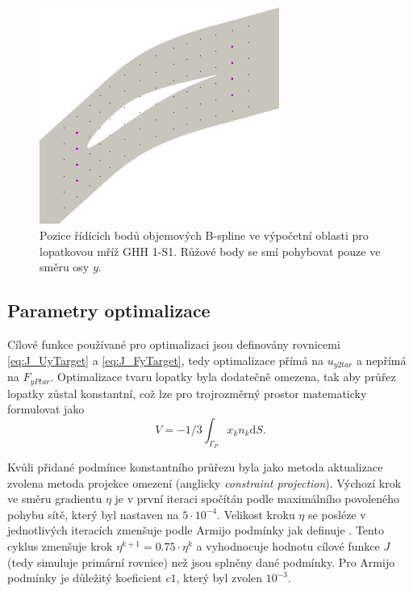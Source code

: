 \begin{figure}
	\includegraphics[width=0.7\textwidth]{img/cps.png}
	\caption{Pozice řídících bodů objemových B-spline ve výpočetní oblasti pro lopatkovou mříž GHH 1-S1. Růžové body se smí pohybovat pouze ve směru osy $ y $.}
	\label{fig:ghs1_cps}
\end{figure}


\subsection{Parametry optimalizace}
Cílové funkce používané pro optimalizaci jsou definovány rovnicemi \ref{eq:J_UyTarget} a \ref{eq:J_FyTarget}, tedy optimalizace přímá na $ u_{y2tar} $ a nepřímá na $ F_{yPtar} $. Optimalizace tvaru lopatky byla dodatečně omezena, tak aby průřez lopatky zůstal konstantní, což lze pro trojrozměrný prostor matematicky formulovat jako
\begin{equation} 
V=-1/3\int_{\Gamma_P}x_kn_k\mathrm{d}S.
\end{equation}

Kvůli přidané podmínce konstantního průřezu byla jako metoda aktualizace zvolena metoda projekce omezení (anglicky \textit{constraint projection}). Výchozí krok ve směru gradientu $ \eta $ je v první iteraci spočítán podle maximálního povoleného pohybu sítě, který byl nastaven na $ 5\cdot10^{-4} $. Velikost kroku $ \eta $ se posléze v jednotlivých iteracích zmenšuje podle Armijo podmínky jak definuje \cite{nocedal1999numerical}. Tento cyklus zmenšuje krok $ \eta^{k+1}=0.75\cdot\eta^{k} $ a vyhodnocuje hodnotu cílové funkce $ J $ (tedy simuluje primární rovnice) než jsou splněny dané podmínky. Pro Armijo podmínky je důležitý koeficient $ c1 $, který byl zvolen $ 10^{-3} $.

